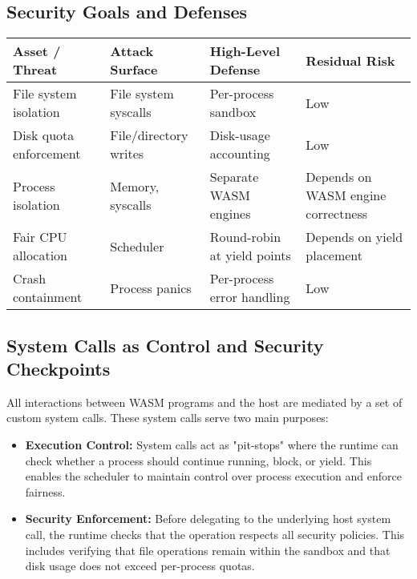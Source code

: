 \documentclass[10pt,a4paper,twocolumn]{IEEEtran}
\begin{document}
\subsection*{Security Goals and Defenses}
\begin{center}
\small
\begin{tabular}{|p{1.5cm}|p{1.9cm}|p{1.3cm}|p{1.25cm}|}
\hline
\textbf{Asset / Threat} & \textbf{Attack Surface} & \textbf{High-Level Defense} & \textbf{Residual Risk} \\
\hline
File system isolation & File system syscalls & Per-process sandbox & Low \\
\hline
Disk quota enforcement & File/directory writes & Disk-usage accounting & Low \\
\hline
Process isolation & Memory, syscalls & Separate WASM engines & Depends on WASM engine correctness \\
\hline
Fair CPU allocation & Scheduler & Round-robin at yield points & Depends on yield placement \\
\hline
Crash containment & Process panics & Per-process error handling & Low \\
\hline
\end{tabular}
\end{center}
\vspace{0.5em}

\subsection*{System Calls as Control and Security Checkpoints}
All interactions between WASM programs and the host are mediated by a set of custom system calls. These system calls serve two main purposes:
\begin{itemize}
    \item \textbf{Execution Control:} System calls act as "pit-stops" where the runtime can check whether a process should continue running, block, or yield. This enables the scheduler to maintain control over process execution and enforce fairness.
    \item \textbf{Security Enforcement:} Before delegating to the underlying host system call, the runtime checks that the operation respects all security policies. This includes verifying that file operations remain within the sandbox and that disk usage does not exceed per-process quotas.
\end{itemize}
\end{document}
